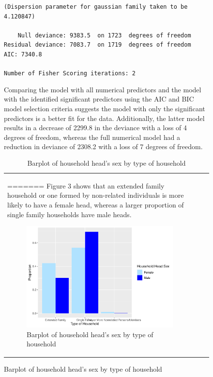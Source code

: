 \documentclass[
]{article}
\begin{document}
\begin{figure}[H]
\begin{verbatim}
(Dispersion parameter for gaussian family taken to be 4.120847)

    Null deviance: 9383.5  on 1723  degrees of freedom
Residual deviance: 7083.7  on 1719  degrees of freedom
AIC: 7340.8

Number of Fisher Scoring iterations: 2
\end{verbatim}

Comparing the model with all numerical predictors and the model with the
identified significant predictors using the AIC and BIC model selection
criteria suggests the model with only the significant predictors is a
better fit for the data. Additionally, the latter model results in a
decrease of 2299.8 in the deviance with a loss of 4 degrees of freedom,
whereas the full numerical model had a reduction in deviance of 2308.2
with a loss of 7 degrees of freedom.

\begin{table}[H]

\caption{\label{tab:model comparison}Comparison of Fitted Models by AIC and BIC criteria }
\centering
\begin{tabular}[t]{lrr}
=======
Figure 3 shows that an extended family household or one formed by
non-related individuals is more likely to have a female head, whereas a
larger proportion of single family households have male heads.

\begin{figure}[H]

{\centering \includegraphics[width=0.8\linewidth]{Group_01_Project2_demo_files/figure-latex/barplot of sex by type of household-1} 

}

\caption{Barplot of household head's sex by type of household}\label{fig:barplot of sex by type of household}
\end{figure}


\end{tabular}
\end{table}
\end{figure}
\end{document}
